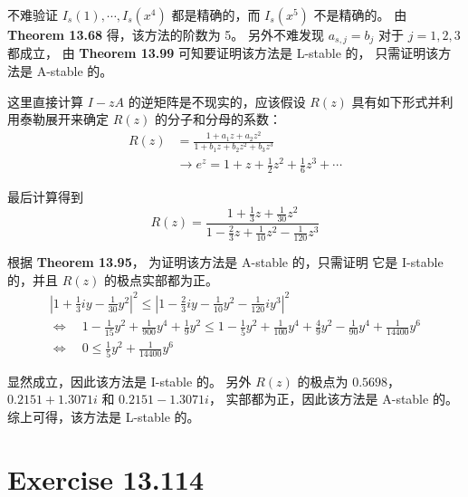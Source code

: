 \documentclass[a4paper]{article}
\begin{document}
\par 不难验证 $I_s(1), \cdots, I_s(x^4)$ 都是精确的，而 $I_s(x^5)$ 不是精确的。
由 \textbf{Theorem 13.68} 得，该方法的阶数为 5。
另外不难发现 $a_{s,j} = b_j$ 对于 $j = 1, 2, 3$ 都成立，
由 \textbf{Theorem 13.99} 可知要证明该方法是 L-stable 的，
只需证明该方法是 A-stable 的。
\par 这里直接计算 $I-zA$ 的逆矩阵是不现实的，应该假设
$R(z)$ 具有如下形式并利用泰勒展开来确定 $R(z)$ 的分子和分母的系数：
\begin{equation}
    \begin{aligned}
        R(z) &= \frac{1 + a_1 z + a_2 z^2}
        {1 + b_1 z + b_2 z^2 + b_3 z^3}\\ 
        &\to e^{z} = 1 + z + \frac{1}{2} z^2 + \frac{1}{6} z^3 + \cdots
    \end{aligned}
\end{equation}
\par 最后计算得到
\begin{equation}
    R(z) = \frac{1 + \frac{1}{3} z + \frac{1}{30} z^2}
        {1 - \frac{2}{3} z + \frac{1}{10} z^2 - \frac{1}{120} z^3}
\end{equation}
\par 根据 \textbf{Theorem 13.95}，
为证明该方法是 A-stable 的，只需证明
它是 I-stable 的，并且 $R(z)$ 的极点实部都为正。
\begin{equation}
    \begin{gathered}
        \left|
            1+\frac{1}{3}iy - \frac{1}{30} y^2
        \right|^2
        \leq \left|
            1 - \frac{2}{3} iy - \frac{1}{10} y^2 - \frac{1}{120} i y^3
        \right|^2\\
        \Leftrightarrow 
        \quad
        1- \frac{1}{15} y^2 + \frac{1}{900} y^4 + \frac{1}{9} y^2
        \leq 
        1- \frac{1}{5} y^2 + \frac{1}{100} y^4
        +\frac{4}{9}y^2- \frac{1}{90} y^4 + \frac{1}{14400} y^6\\
        \Leftrightarrow 
        \quad
        0\leq \frac{1}{5}y^2+\frac{1}{14400}y^6
    \end{gathered}
\end{equation}
\par 显然成立，因此该方法是 I-stable 的。
另外 $R(z)$ 的极点为 $0.5698$， $0.2151 + 1.3071i$ 和 $0.2151 - 1.3071i$，
实部都为正，因此该方法是 A-stable 的。
综上可得，该方法是 L-stable 的。

\section*{Exercise 13.114}
\end{document}
